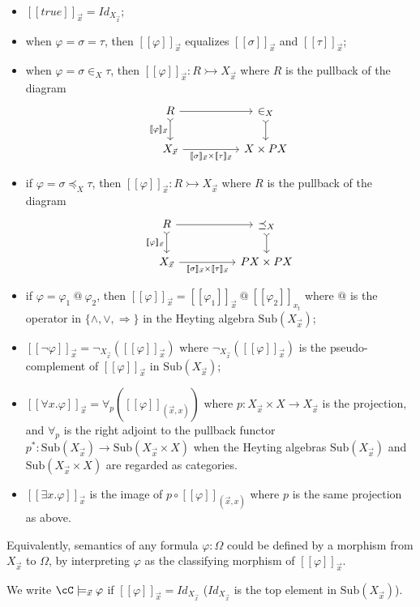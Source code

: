 \documentclass[preprint,3p,times]{elsarticle}
\newcommand{\Sub}{\mathrm{Sub}}
\def\sem#1{[\![ #1 ] \!]}
\begin{document}
\begin{itemize}
\item $\sem{true}_{\vec{x}} = Id_{X_{\vec{x}}}$; 
\item when $\varphi = \sigma = \tau$, then $\sem{\varphi}_{\vec{x}}$ equalizes $\sem{\sigma}_{\vec{x}}$ and $\sem{\tau}_{\vec{x}}$;
\item when $\varphi = \sigma \in_X \tau$, then $\sem{\varphi}_{\vec{x}} : R \rightarrowtail X_{\vec{x}}$ where $R$ is the pullback of the diagram
\[\begin{tikzcd}[column sep = 5em]
	R & {\in_X} \\
	{X_{\vec{x}}} & {X \times PX}
	\arrow[from=1-1, to=1-2]
	\arrow[tail, from=1-2, to=2-2]
	\arrow["{\sem{\varphi}_{\vec{x}}}"', tail, from=1-1, to=2-1]
	\arrow["{\sem{\sigma}_{\vec{x}} \times \sem{\tau}_{\vec{x}}}"', from=2-1, to=2-2]
\end{tikzcd}\]
\item if $\varphi = \sigma \preceq_X \tau$, then $\sem{\varphi}_{\vec{x}} : R \rightarrowtail X_{\vec{x}}$  where $R$ is the pullback of the diagram 
\[\begin{tikzcd}[column sep = 5em]
	R & {\preceq_X} \\
	{X_{\vec{x}}} & {PX \times PX}
	\arrow[from=1-1, to=1-2]
	\arrow[tail, from=1-2, to=2-2]
	\arrow["{\sem{\varphi}_{\vec{x}}}"', tail, from=1-1, to=2-1]
	\arrow["{\sem{\sigma}_{\vec{x}} \times \sem{\tau}_{\vec{x}}}"', from=2-1, to=2-2]
\end{tikzcd}\]
\item if $\varphi = \varphi_1~@~\varphi_2$, then $\sem{\varphi}_{\vec{x}} = \sem{\varphi_1}_{\vec{x}}~@~\sem{\varphi_2}_{x_t}$ where $@$ is the operator in $\{\wedge,\vee,\Rightarrow\}$ in the Heyting algebra $\Sub(X_{\vec{x}})$;
\item $\sem{\neg \varphi}_{\vec{x}} = \neg_{X_{\vec{x}}} (\sem{\varphi}_{\vec{x}})$ where $\neg_{X_{\vec{x}}}(\sem{\varphi}_{\vec{x}})$ is the pseudo-complement of $\sem{\varphi}_{\vec{x}}$ in $\Sub(X_{\vec{x}})$;
\item $\sem{\forall x.\varphi}_{\vec{x}} = \forall_p(\sem{\varphi}_{(\vec{x},x)})$ where $p : X_{\vec{x}} \times X \to X_{\vec{x}}$ is the projection, and $\forall_p$ is the right adjoint to the pullback functor $p^* : \Sub(X_{\vec{x}}) \to \Sub(X_{\vec{x}} \times X)$ when the Heyting algebras $\Sub(X_{\vec{x}})$ and $\Sub(X_{\vec{x}} \times X)$ are regarded as categories. 
\item $\sem{\exists x.\varphi}_{\vec{x}}$ is the image of $p \circ \sem{\varphi}_{(\vec{x},x)}$ where $p$ is the same projection as above.
\end{itemize}
Equivalently, semantics of any formula $\varphi:\Omega$ could be defined by a morphism from $X_{\vec{x}}$ to $\Omega$, by interpreting $\varphi$ as the classifying morphism of $\sem{\varphi}_{\vec{x}}$. 

We write $\cC \models_{\vec{x}} \varphi$ if $\sem{\varphi}_{\vec{x}} = Id_{X_{\vec{x}}}$ ($Id_{X_{\vec{x}}}$ is the top element in $\Sub(X_{\vec{x}})$).

 
\end{document}

